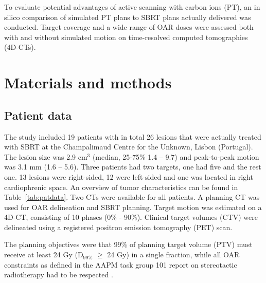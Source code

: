 \documentclass[type=dr, dr=rernat, acm$^3$entcolor=tud7b,colorbacktitle, bigchapter, openright, twoside, 12pt ]{tudthesis}
\begin{document}
To evaluate potential advantages of active scanning with carbon ions (PT), an in silico comparison of simulated PT plans to 
SBRT plans actually delivered was conducted. Target coverage and a wide range of OAR doses were assessed both with and without simulated motion on time-resolved computed tomographies (4D-CTs).



\section{Materials and methods}

\subsection{Patient data}

The study included 19 patients with in total 26 lesions that were actually treated with SBRT at the Champalimaud Centre for the Unknown, Lisbon (Portugal). The lesion size was 2.9 cm$^3$ (median, 25-75\% 1.4 – 9.7) and peak-to-peak motion was 3.1 mm (1.6 – 5.6). Three patients had two targets, one had five and the rest one. 13 lesions were right-sided, 12 were left-sided and one was located in right cardiophrenic space. An overview of tumor characteristics can be found in Table~\ref{tab:patdata}.
Two CTs were available for all patients. A planning CT was used for OAR delineation and SBRT planning. Target motion was estimated on a 4D-CT, consisting of 10 phases (0\% - 90\%). Clinical target volumes (CTV) were delineated using a registered positron emission tomography (PET) scan.

The planning objectives were that 99\% of planning target volume (PTV) must receive at least 24 Gy (D$_{99\%}$ $\geq$ 24 Gy) in a single fraction, while all OAR constraints as defined in the AAPM task group 101 report on stereotactic radiotherapy had to be respected \cite{Benedict2010}.
\end{document}
